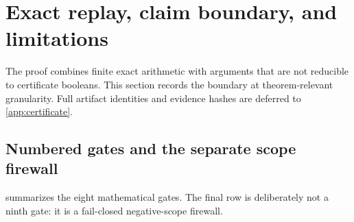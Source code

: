 \section{Exact replay, claim boundary, and limitations}
\label{sec:replay-scope}

The proof combines finite exact arithmetic with arguments that are not
reducible to certificate booleans.  This section records the boundary at
theorem-relevant granularity.  Full artifact identities and evidence hashes
are deferred to \cref{app:certificate}.

\subsection{Numbered gates and the separate scope firewall}

 summarizes the eight mathematical gates.  The final row is
deliberately not a ninth gate: it is a fail-closed negative-scope firewall.

